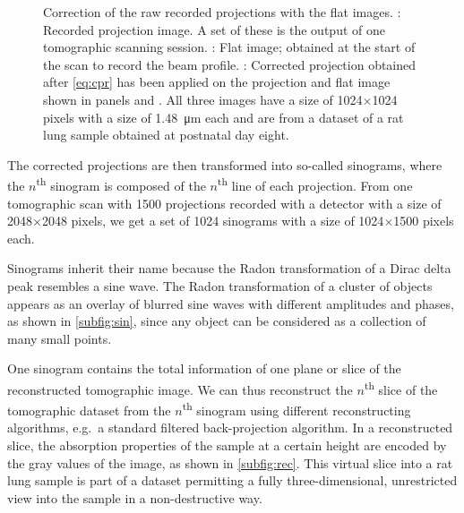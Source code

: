 \begin{figure}	[htb]
{{%
			\label{subfig:cpr}%
			}%
	}%
	\caption[Correction of the projections with flat images]{Correction of the raw recorded projections with the flat images. : Recorded projection image. A set of these is the output of one tomographic scanning session. : Flat image; obtained at the start of the scan to record the beam profile. : Corrected projection obtained after \autoref{eq:cpr} has been applied on the projection and flat image shown in panels  and . All three images have a size of 1024$\times$1024 pixels with a size of \SI{1.48}{\micro\meter} each and are from a dataset of a rat lung sample obtained at postnatal day eight.}
	\label{fig:corrected projection}%
\end{figure}%

The corrected projections are then transformed into so-called sinograms, where the $n$\textsuperscript{th} sinogram is composed of the $n$\textsuperscript{th} line of each projection. From one tomographic scan with 1500 projections recorded with a detector with a size of 2048$\times$2048 pixels, we get a set of 1024 sinograms with a size of 1024$\times$1500 pixels each.

Sinograms inherit their name because the Radon transformation of a Dirac delta peak resembles a sine wave. The Radon transformation of a cluster of objects appears as an overlay of blurred sine waves with different amplitudes and phases, as shown in \autoref{subfig:sin}, since any object can be considered as a collection of many small points.

One sinogram contains the total information of one plane or slice of the reconstructed tomographic image. We can thus reconstruct the $n$\textsuperscript{th} slice of the tomographic dataset from the $n$\textsuperscript{th} sinogram using different reconstructing algorithms, e.g.\ a standard filtered back-projection algorithm. In a reconstructed slice, the absorption properties of the sample at a certain height are encoded by the gray values of the image, as shown in \autoref{subfig:rec}. This virtual slice into a rat lung sample is part of a dataset permitting a fully three-dimensional, unrestricted view into the sample in a non-destructive way.

